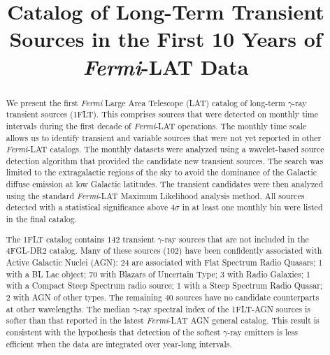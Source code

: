 \documentclass{aastex62}
\newcommand\fermilat{{\it Fermi}-LAT }
\begin{document}
\title{Catalog of Long-Term Transient Sources in the First 10 Years of \fermilat Data}




\collaboration{The \fermilat collaboration}




\begin{abstract}

We present the first \textit{Fermi} Large Area Telescope (LAT) catalog of long-term $\gamma$-ray transient sources (1FLT). This comprises sources that were detected on monthly time intervals during the first decade of \textit{Fermi}-LAT operations.
The monthly time scale allows us to identify transient and variable sources that were not yet reported in other \fermilat catalogs. 
The monthly datasets were analyzed using a wavelet-based source detection algorithm that provided the candidate new transient sources. The search was limited to the extragalactic regions of the sky to avoid the dominance of the Galactic diffuse emission at low Galactic latitudes.
The transient candidates were then analyzed using the standard \fermilat Maximum Likelihood analysis method. All sources detected with a statistical significance above $4\sigma$ in at least one monthly bin were listed in the final catalog.

The 1FLT catalog contains 142 transient $\gamma$-ray sources that are not included in the 4FGL-DR2 catalog. 
Many of these sources (102) have been confidently associated with Active Galactic Nuclei (AGN): 24 are associated with Flat Spectrum Radio Quasars; 1 with a BL Lac object; 70 with Blazars of Uncertain Type; 3 with Radio Galaxies; 1 with a Compact Steep Spectrum radio source; 1 with a Steep Spectrum Radio Quasar; 2 with AGN of other types. The remaining 40 sources have no candidate counterparts at other wavelengths. 
The median $\gamma$-ray spectral index of the 1FLT-AGN sources is softer than that reported in the latest \fermilat AGN general catalog. This result is consistent with the hypothesis that detection of the softest $\gamma$-ray emitters is less efficient when the data are integrated over year-long intervals. 





\end{abstract}
\end{document}

